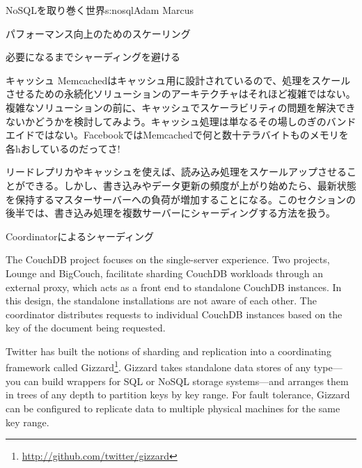 \begin{aosachapter}{NoSQLを取り巻く世界}{s:nosql}{Adam Marcus}
\begin{aosasect1}{パフォーマンス向上のためのスケーリング}
\begin{aosasect2}{必要になるまでシャーディングを避ける}
\begin{aosasect3}{キャッシュ}
Memcachedはキャッシュ用に設計されているので、処理をスケールさせるための永続化ソリューションのアーキテクチャはそれほど複雑ではない。複雑なソリューションの前に、キャッシュでスケーラビリティの問題を解決できないかどうかを検討してみよう。キャッシュ処理は単なるその場しのぎのバンドエイドではない。FacebookではMemcachedで何と数十テラバイトものメモリを各hおしているのだってさ!

\end{aosasect3}

リードレプリカやキャッシュを使えば、読み込み処理をスケールアップさせることができる。しかし、書き込みやデータ更新の頻度が上がり始めたら、最新状態を保持するマスターサーバーへの負荷が増加することになる。このセクションの後半では、書き込み処理を複数サーバーにシャーディングする方法を扱う。

\end{aosasect2}

\begin{aosasect2}{Coordinatorによるシャーディング}

The CouchDB project focuses on the single-server experience.  Two
projects, Lounge and BigCouch, facilitate sharding CouchDB workloads
through an external proxy, which acts as a front end to standalone
CouchDB instances.  In this design, the standalone installations are
not aware of each other.  The coordinator distributes requests to
individual CouchDB instances based on the key of the document being
requested.

Twitter has built the notions of sharding and replication into a
coordinating framework called Gizzard\footnote{\url{http://github.com/twitter/gizzard}}.  Gizzard takes standalone data stores of any
type---you can build wrappers for SQL or NoSQL storage systems---and
arranges them in trees of any depth to partition keys by key range.
For fault tolerance, Gizzard can be configured to replicate data to
multiple physical machines for the same key range.


\end{aosasect2}
\end{aosasect1}
\end{aosachapter}
